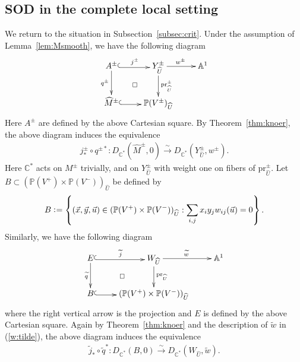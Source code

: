 \documentclass[11pt]{amsart}
\theoremstyle{plain}
\begin{document}
\subsection{SOD in the complete local setting}
We return to the situation in Subsection~\ref{subsec:crit}. 
Under the assumption of Lemma~\ref{lem:Msmooth}, we have the following diagram
\begin{align*}
\xymatrix{
A^{\pm} \ar[d]_-{q^{\pm}}
\ar@<-0.3ex>@{^{(}->}[r]^-{j^{\pm}} 
\ar@{}[dr]|\square
& Y_{\widehat{U}}^{\pm} \ar[r]^{w^{\pm}} 
\ar[d]^-{\mathrm{pr}_{\widehat{U}}^{\pm}} & \mathbb{A}^1 \\
\widehat{M}^{\pm} \ar@<-0.3ex>@{^{(}->}[r] & \mathbb{P}(V^{\pm})_{\widehat{U}}
}
\end{align*}
Here 
$A^{\pm}$ are defined by the 
above Cartesian square. 
By Theorem~\ref{thm:knoer},
the above diagram induces the equivalence
\begin{align}\label{equiv:01}
j_{\ast}^{\pm} \circ q^{\pm \ast} \colon 
D_{\mathbb{C}^{\ast}}(\widehat{M}^{\pm}, 0) \stackrel{\sim}{\to}
D_{\mathbb{C}^{\ast}}(Y_{\widehat{U}}^{\pm}, w^{\pm}).
\end{align} 
Here $\mathbb{C}^{\ast}$ acts on $M^{\pm}$ trivially, and 
on $Y_{\widehat{U}}^{\pm}$
with weight one on fibers of $\mathrm{pr}_{\widehat{U}}^{\pm}$. 
Let $B \subset (\mathbb{P}(V^+) \times \mathbb{P}(V^-))_{\widehat{U}}$
be defined by
\begin{align*}
B\cneq \left\{ (\vec{x}, \vec{y}, \vec{u}) 
\in (\mathbb{P}(V^+) \times \mathbb{P}(V^-))_{\widehat{U}} 
:
\sum_{i, j} x_i y_j w_{ij}(\vec{u})=0
 \right\}.
\end{align*}
Similarly, we have the following diagram
\begin{align*}
\xymatrix{
E\ar[d]_-{\widetilde{q}}
\ar@<-0.3ex>@{^{(}->}[r]^-{\widetilde{j}} 
\ar@{}[dr]|\square
& W_{\widehat{U}} \ar[r]^{\widetilde{w}} \ar[d]^-{\mathrm{pr}_{\widehat{U}}}
 & \mathbb{A}^1  \\
B \ar@<-0.3ex>@{^{(}->}[r] & (\mathbb{P}(V^{+}) \times 
\mathbb{P}(V^-))_{\widehat{U}}
}
\end{align*}
where
the right vertical arrow is the projection 
and $E$ is defined by the above Cartesian square. 
Again by Theorem~\ref{thm:knoer}
and the description of $\widetilde{w}$ in (\ref{w:tilde}), 
the above diagram induces the equivalence
\begin{align}\label{equiv:02}
\widetilde{j}_{\ast} \circ \widetilde{q}^{\ast} \colon 
D_{\mathbb{C}^{\ast}}(B, 0) \stackrel{\sim}{\to}
D_{\mathbb{C}^{\ast}}(W_{\widehat{U}}, \widetilde{w}).
\end{align} 
\end{document}

